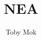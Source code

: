 \documentclass{article}
\begin{document}
\begin{titlepage}
\title{NEA}
\author{Toby Mok}
\date{}
\end{titlepage}

\maketitle

\newpage
\tableofcontents




\end{document}
